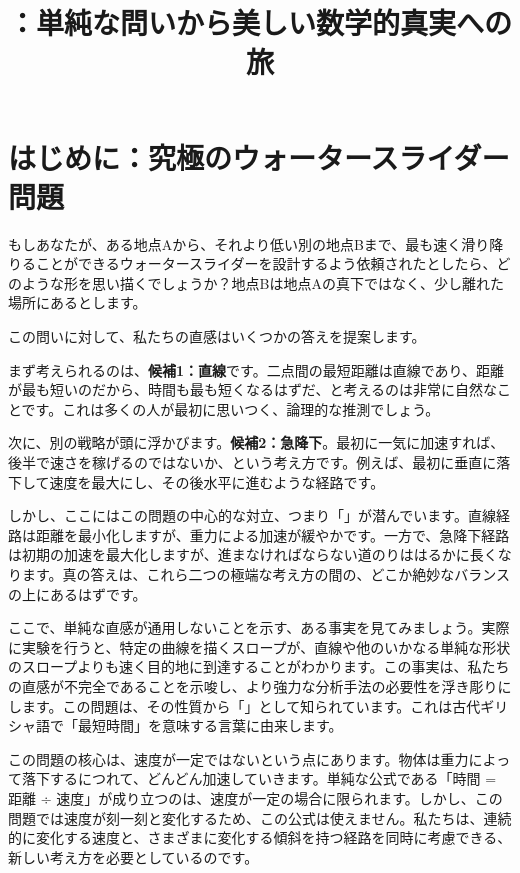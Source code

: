 \documentclass[12pt,a4paper]{ltjsarticle}
\title{\ruby{最速降下曲線}{さいそくこうかきょくせん}：単純な問いから美しい数学的真実への旅}
\author{}
\date{}
\begin{document}
\maketitle

\section{はじめに：究極のウォータースライダー問題}

もしあなたが、ある地点Aから、それより低い別の地点Bまで、最も速く滑り降りることができるウォータースライダーを設計するよう依頼されたとしたら、どのような形を思い描くでしょうか？地点Bは地点Aの真下ではなく、少し離れた場所にあるとします。

この問いに対して、私たちの直感はいくつかの答えを提案します。

まず考えられるのは、\textbf{候補1：直線}です。二点間の最短距離は直線であり、距離が最も短いのだから、時間も最も短くなるはずだ、と考えるのは非常に自然なことです。これは多くの人が最初に思いつく、論理的な推測でしょう。

次に、別の戦略が頭に浮かびます。\textbf{候補2：急降下}。最初に一気に加速すれば、後半で速さを稼げるのではないか、という考え方です。例えば、最初に垂直に落下して速度を最大にし、その後水平に進むような経路です。

しかし、ここにはこの問題の中心的な対立、つまり「」が潜んでいます。直線経路は距離を最小化しますが、重力による加速が緩やかです。一方で、急降下経路は初期の加速を最大化しますが、進まなければならない道のりははるかに長くなります。真の答えは、これら二つの極端な考え方の間の、どこか絶妙なバランスの上にあるはずです。

ここで、単純な直感が通用しないことを示す、ある事実を見てみましょう。実際に実験を行うと、特定の曲線を描くスロープが、直線や他のいかなる単純な形状のスロープよりも速く目的地に到達することがわかります。この事実は、私たちの直感が不完全であることを示唆し、より強力な分析手法の必要性を浮き彫りにします。この問題は、その性質から「」として知られています。これは古代ギリシャ語で「最短時間」を意味する言葉に由来します。

この問題の核心は、速度が一定ではないという点にあります。物体は重力によって落下するにつれて、どんどん加速していきます。単純な公式である「時間 = 距離 ÷ 速度」が成り立つのは、速度が一定の場合に限られます。しかし、この問題では速度が刻一刻と変化するため、この公式は使えません。私たちは、連続的に変化する速度と、さまざまに変化する傾斜を持つ経路を同時に考慮できる、新しい考え方を必要としているのです。
\end{document}
